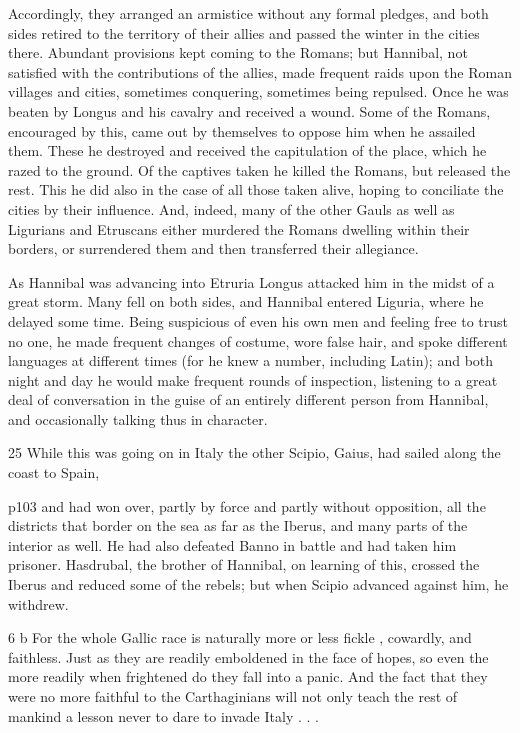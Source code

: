 Accordingly, they arranged an armistice without any formal pledges, and both sides retired to the territory of their allies and passed the winter in the cities there. Abundant provisions kept coming to the Romans; but Hannibal, not satisfied with the contributions of the allies, made frequent raids upon the Roman villages and cities, sometimes conquering, sometimes being repulsed. Once he was beaten by Longus and his cavalry and received a wound. Some of the Romans, encouraged by this, came out by themselves to oppose him when he assailed them. These he destroyed and received the capitulation of the place, which he razed to the ground. Of the captives taken he killed the Romans, but released the rest. This he did also in the case of all those taken alive, hoping to conciliate the cities by their influence. And, indeed, many of the other Gauls as well as Ligurians and Etruscans either murdered the Romans dwelling within their borders, or surrendered them and then transferred their allegiance.

As Hannibal was advancing into Etruria Longus attacked him in the midst of a great storm. Many fell on both sides, and Hannibal entered Liguria, where he delayed some time. Being suspicious of even his own men and feeling free to trust no one, he made frequent changes of costume, wore false hair, and spoke different languages at different times (for he knew a number, including Latin); and both night and day he would make frequent rounds of inspection, listening to a great deal of conversation in the guise of an entirely different person from Hannibal, and occasionally talking thus in character.

25
While this was going on in Italy the other Scipio, Gaius, had sailed along the coast to Spain,

p103 and had won over, partly by force and partly without opposition, all the districts that border on the sea as far as the Iberus, and many parts of the interior as well. He had also defeated Banno in battle and had taken him prisoner. Hasdrubal, the brother of Hannibal, on learning of this, crossed the Iberus and reduced some of the rebels; but when Scipio advanced against him, he withdrew.

6 b
For the whole Gallic race is naturally more or less fickle , cowardly, and faithless. Just as they are readily emboldened in the face of hopes, so even the more readily when frightened do they fall into a panic. And the fact that they were no more faithful to the Carthaginians will not only teach the rest of mankind a lesson never to dare to invade Italy . . .

